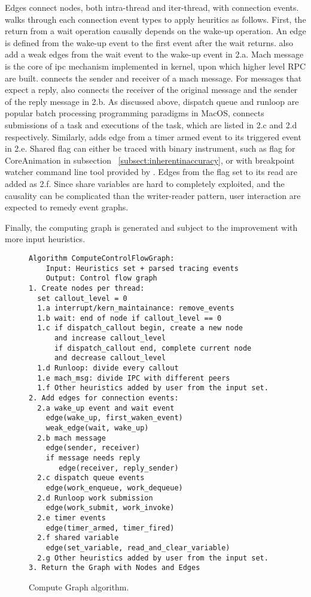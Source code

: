 Edges connect nodes, both intra-thread and iter-thread, with connection events.
\xxx walks through each connection event types to apply heuritics as follows.
First, the return from a wait operation causally depends on the wake-up
operation. An edge is defined from the wake-up event to the first event after
the wait returns. \xxx also add a weak edges from the wait event to the wake-up
event in 2.a. Mach message is the core of ipc mechanism implemented in kernel,
upon which higher level RPC are built. \xxx connects the sender and receiver
of a mach message. For messages that expect a reply, \xxx also connects the
receiver of the original message and the sender of the reply message in 2.b.
As discussed above, dispatch queue and runloop are popular batch processing
programming paradigms in MacOS, \xxx connects submissions of a task and
executions of the task, which are listed in 2.c and 2.d respectively. Similarly,
\xxx adds edge from a timer armed event to its triggered event in 2.e. Shared
flag can either be traced with binary instrument, such as 
flag for CoreAnimation in subsection ~\ref{subsect:inherentinaccuracy}, or with
breakpoint watcher command line tool provided by \xxx. Edges from the flag set
to its read are added as 2.f. Since share variables are hard to completely
exploited, and the causality can be complicated than the writer-reader pattern,
user interaction are expected to remedy event graphs.

Finally, the computing graph is generated and subject to the improvement with
more input heuristics.

\begin{figure}[tb]
\footnotesize\begin{verbatim}
Algorithm ComputeControlFlowGraph:
    Input: Heuristics set + parsed tracing events
    Output: Control flow graph
1. Create nodes per thread:
  set callout_level = 0
  1.a interrupt/kern_maintainance: remove_events
  1.b wait: end of node if callout_level == 0
  1.c if dispatch_callout begin, create a new node
      and increase callout_level
      if dispatch_callout end, complete current node
      and decrease callout_level
  1.d Runloop: divide every callout
  1.e mach_msg: divide IPC with different peers
  1.f Other heuristics added by user from the input set.
2. Add edges for connection events:
  2.a wake_up event and wait event
  	edge(wake_up, first_waken_event)
	weak_edge(wait, wake_up)
  2.b mach message
  	edge(sender, receiver)
    if message needs reply
       edge(receiver, reply_sender)
  2.c dispatch queue events
  	edge(work_enqueue, work_dequeue)
  2.d Runloop work submission
  	edge(work_submit, work_invoke)
  2.e timer events
  	edge(timer_armed, timer_fired)
  2.f shared variable
  	edge(set_variable, read_and_clear_variable)
  2.g Other heuristics added by user from the input set.
3. Return the Graph with Nodes and Edges
\end{verbatim}
    \caption{\xxx Compute Graph algorithm.}
    \label{fig:alg-graphcomputing}
\end{figure}
